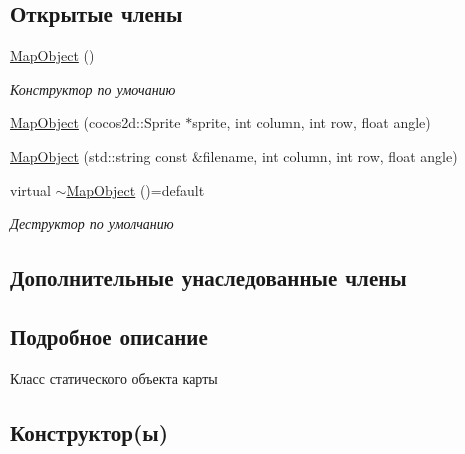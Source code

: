 \subsection*{Открытые члены}
\begin{DoxyCompactItemize}
\item 
\mbox{\label{classrtm_1_1_map_object_a5a739a68e3ff7439f083a998a7760287}} 
\hyperlink{classrtm_1_1_map_object_a5a739a68e3ff7439f083a998a7760287}{Map\+Object} ()
\begin{DoxyCompactList}\small\item\em Конструктор по умочанию \end{DoxyCompactList}\item 
\hyperlink{classrtm_1_1_map_object_a39e9366932d38519d7358f74ebee9fa4}{Map\+Object} (cocos2d\+::\+Sprite $\ast$sprite, int column, int row, float angle)
\item 
\hyperlink{classrtm_1_1_map_object_ae4fbfe3193009e9e92140dc946a31bcc}{Map\+Object} (std\+::string const \&filename, int column, int row, float angle)
\item 
\mbox{\label{classrtm_1_1_map_object_ae54a583ef69280a7b813f370979bd1b7}} 
virtual \hyperlink{classrtm_1_1_map_object_ae54a583ef69280a7b813f370979bd1b7}{$\sim$\+Map\+Object} ()=default
\begin{DoxyCompactList}\small\item\em Деструктор по умолчанию \end{DoxyCompactList}\end{DoxyCompactItemize}
\subsection*{Дополнительные унаследованные члены}


\subsection{Подробное описание}
Класс статического объекта карты 

\subsection{Конструктор(ы)}
\mbox{\label{classrtm_1_1_map_object_a39e9366932d38519d7358f74ebee9fa4}} 
